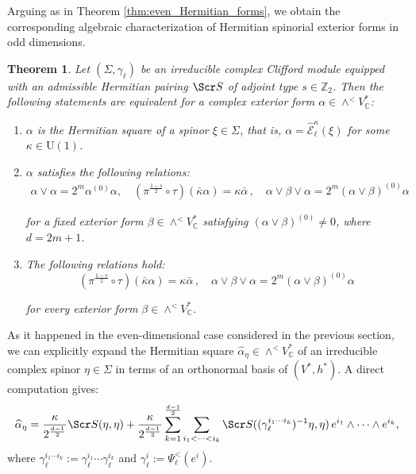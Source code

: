 \documentclass[10pt,a4paper,twoside,reqno]{amsart}
\theoremstyle{plain}
\newtheorem{thm}{Theorem}[section]
\theoremstyle{definition}
\theoremstyle{remark}
\def\C{\mathbb{C}}
\def\scS{\Scr S}
\def\U{\mathrm{U}}
\def\hcE{\widehat{\mathcal{E}}}
\begin{document}
Arguing as in Theorem \ref{thm:even_Hermitian_forms}, we obtain the corresponding algebraic characterization of Hermitian spinorial exterior forms in odd dimensions.

\begin{thm}\label{thm_Hermitian_square_odd}
Let $(\Sigma,\gamma_\ell)$ be an irreducible complex Clifford module equipped with an admissible Hermitian pairing $\scS$ of adjoint type $s\in\mathbb{Z}_2$. Then the following statements are equivalent for a complex exterior form $\alpha\in\wedge^<V^*_\C$: 
\begin{enumerate}
\item[\normalfont(a)] $\alpha$ is the Hermitian square of a spinor $\xi\in\Sigma$, that is, $\alpha=\hcE_\ell^\kappa(\xi)$ for some $\kappa\in\U(1)$.
\item[\normalfont(b)] $\alpha$ satisfies the following relations: 
\begin{eqnarray*}
\alpha\vee\alpha = 2^m\alpha^{(0)}\alpha, \quad(\pi^{\frac{1-s}{2}}\circ\tau)(\bar\kappa\alpha) = \kappa \bar{\alpha}\, , \quad\alpha\vee\beta\vee\alpha=2^m(\alpha\vee\beta)^{(0)}\alpha
\end{eqnarray*}

\noindent
for a fixed exterior form $\beta\in\wedge^<V^*_\C$ satisfying $(\alpha\vee\beta)^{(0)}\neq0$, where $d = 2m + 1$.
\item[\normalfont(c)] The following relations hold: 
\begin{equation*}
(\pi^{\frac{1-s}{2}}\circ\tau)(\bar\kappa\alpha) = \kappa \bar{\alpha}\, , \quad\alpha\vee\beta\vee\alpha=2^m(\alpha\vee\beta)^{(0)}\alpha
\end{equation*}

\noindent
for every exterior form $\beta\in\wedge^<V^*_\C$.
\end{enumerate}
\end{thm}

\noindent
As it happened in the even-dimensional case considered in the previous section, we can explicitly expand the Hermitian square $\widehat{\alpha}_\eta\in\wedge^<V^*_\C$ of an irreducible complex spinor $\eta\in\Sigma$ in terms of an orthonormal basis of $(V^*,h^*)$. A direct computation gives:
\begin{equation}
\label{eq:oddhermitianexpansion}
 \widehat{\alpha}_{\eta} = \frac{\kappa}{2^{\frac{d-1}{2}}} \scS(\eta,\eta) + \frac{\kappa}{2^{\frac{d-1}{2}}} \sum_{k=1}^{\frac{d-1}{2}} \sum_{i_1 < \cdots < i_k} \scS((\gamma_\ell^{i_1 \cdots i_k})^{-1}\eta , \eta)\, e^{i_1}\wedge  \cdots \wedge e^{i_k},
 \end{equation}
where $\gamma_\ell^{i_1\cdots i_k}:=\gamma_\ell^{i_1}\cdots\gamma_\ell^{i_k}$ and $\gamma_\ell^i:=\Psi^<_\ell(e^i)$.
\end{document}
